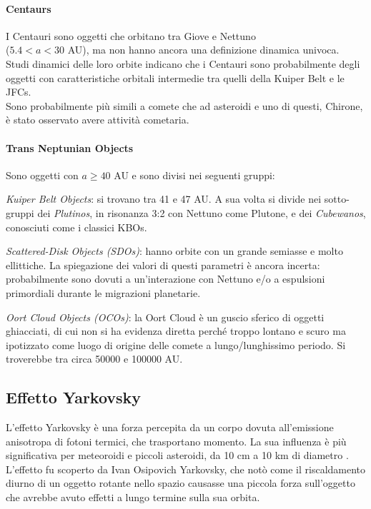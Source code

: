 \paragraph*{Centaurs}
I Centauri sono oggetti che orbitano tra Giove e Nettuno\\($5.4<a<30$ AU), ma non hanno ancora una definizione dinamica univoca.\\
Studi dinamici delle loro orbite indicano che i Centauri sono probabilmente degli oggetti con caratteristiche orbitali intermedie tra quelli della Kuiper Belt e le JFCs.\\
Sono probabilmente più simili a comete che ad asteroidi e uno di questi, Chirone, è stato osservato avere attività cometaria.

\paragraph*{Trans Neptunian Objects}
Sono oggetti con $a\geq 40$ AU e sono divisi nei seguenti gruppi:

\qquad \textit{Kuiper Belt Objects}: si trovano tra 41 e 47 AU. A sua volta si divide nei sotto-gruppi dei \textit{Plutinos}, in risonanza 3:2 con Nettuno come Plutone, e dei \textit{Cubewanos}, conosciuti come i classici KBOs.

\qquad \textit{Scattered-Disk Objects (SDOs)}: hanno orbite con un grande semiasse e molto ellittiche. La spiegazione dei valori di questi parametri è ancora incerta: probabilmente sono dovuti a un’interazione con Nettuno e/o a espulsioni primordiali durante le migrazioni planetarie.

\qquad \textit{Oort Cloud Objects (OCOs)}: la Oort Cloud è un guscio sferico di oggetti ghiacciati, di cui non si ha evidenza diretta perché troppo lontano e scuro ma ipotizzato come luogo di origine delle comete a lungo/lunghissimo periodo. Si troverebbe tra circa 50000 e 100000 AU.

\subsection{Effetto Yarkovsky}
L’effetto Yarkovsky è una forza percepita da un corpo dovuta all’emissione anisotropa di fotoni termici, che trasportano momento. La sua influenza è più significativa per meteoroidi e piccoli asteroidi, da 10 cm a 10 km di diametro \citep{vokrouhlicky_yarkovsky_2015}.\\
L’effetto fu scoperto da Ivan Osipovich Yarkovsky, che notò come il riscaldamento diurno di un oggetto rotante nello spazio causasse una piccola forza sull’oggetto che avrebbe avuto effetti a lungo termine sulla sua orbita.

